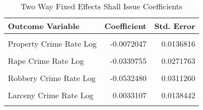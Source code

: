 \begin{table}[H]

\caption{\label{tab:tab:twfe}Two Way Fixed Effects Shall Issue Coefficients}
\centering
\begin{tabular}[t]{lrr}
\toprule
Outcome Variable & Coefficient & Std. Error\\
\midrule
\cellcolor{gray!6}{Violent Crime Rate Log} & \cellcolor{gray!6}{-0.0977525} & \cellcolor{gray!6}{0.0207145}\\
Property Crime Rate Log & -0.0072047 & 0.0136816\\
\cellcolor{gray!6}{Murder Crime Rate Log} & \cellcolor{gray!6}{-0.0506590} & \cellcolor{gray!6}{0.0385770}\\
Rape Crime Rate Log & -0.0339755 & 0.0271763\\
\cellcolor{gray!6}{Assault Crime Rate Log} & \cellcolor{gray!6}{-0.1004015} & \cellcolor{gray!6}{0.0270163}\\
\addlinespace
Robbery Crime Rate Log & -0.0532480 & 0.0311260\\
\cellcolor{gray!6}{Burglary Crime Rate Log} & \cellcolor{gray!6}{-0.0460697} & \cellcolor{gray!6}{0.0190139}\\
Larceny Crime Rate Log & 0.0033107 & 0.0138442\\
\cellcolor{gray!6}{Autotheft Crime Rate Log} & \cellcolor{gray!6}{-0.0089805} & \cellcolor{gray!6}{0.0282748}\\
\bottomrule
\end{tabular}
\end{table}
